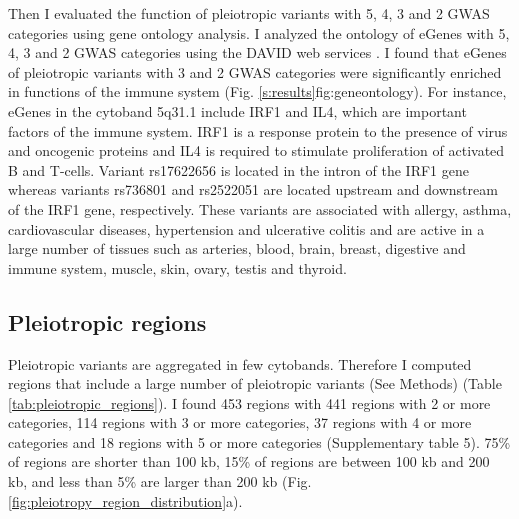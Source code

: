 Then I evaluated the function of pleiotropic variants with 5, 4, 3 and 2 GWAS categories using gene ontology analysis.
%
I analyzed the ontology of eGenes with 5, 4, 3 and 2 GWAS categories using the DAVID web services \citep{2008.Lempicki.Huang,2008.Lempicki.Huang.NucleicAcidsResearch}.
%
I found that eGenes of pleiotropic variants with 3 and 2 GWAS categories were significantly enriched in functions of the immune system (Fig. \ref{s:results}{fig:geneontology}).
For instance, eGenes in the cytoband 5q31.1 include IRF1 and IL4, which are important factors of the immune system.
%
IRF1 is a response protein to the presence of virus and oncogenic proteins and IL4 is required to stimulate proliferation of activated B and T-cells.
%
Variant rs17622656 is located in the intron of the IRF1 gene whereas variants rs736801 and rs2522051 are located upstream and downstream of the IRF1 gene, respectively.
%
These variants are associated with allergy, asthma, cardiovascular diseases, hypertension and ulcerative colitis and are active in a large number of tissues such as arteries, blood, brain, breast, digestive and immune system, muscle, skin, ovary, testis and thyroid.


%

\subsection*{Pleiotropic regions}

Pleiotropic variants are aggregated in few cytobands.
%
Therefore I computed regions that include a large number of pleiotropic variants (See Methods) (Table \ref{tab:pleiotropic_regions}).
%
I found 453 regions with 441 regions with 2 or more categories, 114 regions with 3 or more categories, 37 regions with 4 or more categories and 18 regions with 5 or more categories (Supplementary table 5).
%
75\% of regions are shorter than 100 kb, 15\% of regions are between 100 kb and 200 kb, and less than 5\% are larger than 200 kb (Fig. \ref{fig:pleiotropy_region_distribution}a).

